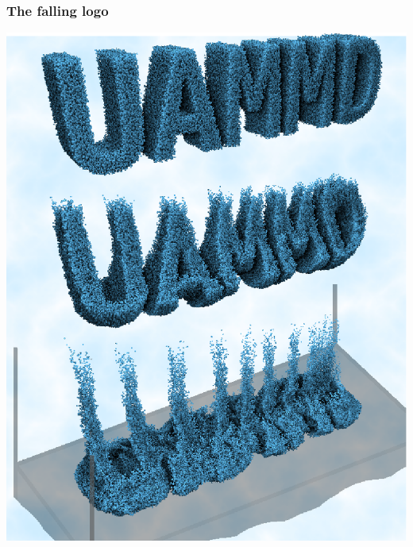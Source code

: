\documentclass[xcolor=dvipsnames, compress]{beamer}
\begin{document}
\begin{frame}[fragile]
  \frametitle{The falling logo}
  \begin{center}
    \includegraphics[height=0.7\paperheight]{gfx/poster}
  \end{center}
\end{frame}
\end{document}
